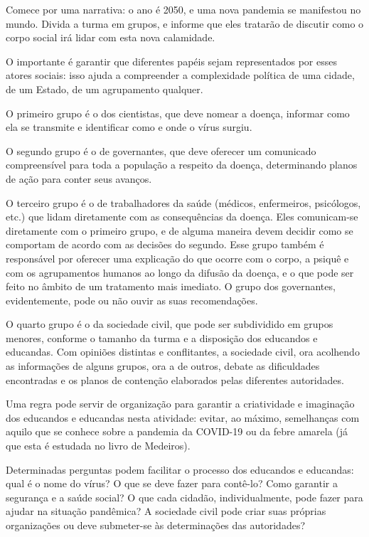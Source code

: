 \documentclass[12pt]{extarticle}
\begin{document}
Comece por uma narrativa: o ano é 2050, e uma nova pandemia se
manifestou no mundo. Divida a turma em grupos, e informe que eles
tratarão de discutir como o corpo social irá lidar com esta nova
calamidade.

O importante é garantir que diferentes papéis sejam representados por
esses atores sociais: isso ajuda a compreender a complexidade política
de uma cidade, de um Estado, de um agrupamento qualquer.

O primeiro grupo é o dos cientistas, que deve nomear a doença, informar
como ela se transmite e identificar como e onde o vírus surgiu.

O segundo grupo é o de governantes, que deve oferecer um comunicado
compreensível para toda a população a respeito da doença, determinando
planos de ação para conter seus avanços.

O terceiro grupo é o de trabalhadores da saúde (médicos, enfermeiros,
psicólogos, etc.) que lidam diretamente com as consequências da doença.
Eles comunicam-se diretamente com o primeiro grupo, e de alguma maneira
devem decidir como se comportam de acordo com as decisões do segundo.
Esse grupo também é responsável por oferecer uma explicação do que
ocorre com o corpo, a psiquê e com os agrupamentos humanos ao longo da
difusão da doença, e o que pode ser feito no âmbito de um tratamento
mais imediato. O grupo dos governantes, evidentemente, pode ou não ouvir
as suas recomendações.

O quarto grupo é o da sociedade civil, que pode ser subdividido em
grupos menores, conforme o tamanho da turma e a disposição dos educandos
e educandas. Com opiniões distintas e conflitantes, a sociedade civil,
ora acolhendo as informações de alguns grupos, ora a de outros, debate
as dificuldades encontradas e os planos de contenção elaborados pelas
diferentes autoridades.

Uma regra pode servir de organização para garantir a criatividade e
imaginação dos educandos e educandas nesta atividade: evitar, ao máximo,
semelhanças com aquilo que se conhece sobre a pandemia da COVID-19 ou da
febre amarela (já que esta é estudada no livro de Medeiros).

Determinadas perguntas podem facilitar o processo dos educandos e
educandas: qual é o nome do vírus? O que se deve fazer para contê-lo?
Como garantir a segurança e a saúde social? O que cada cidadão,
individualmente, pode fazer para ajudar na situação pandêmica? A
sociedade civil pode criar suas próprias organizações ou deve
submeter-se às determinações das autoridades?
\end{document}
